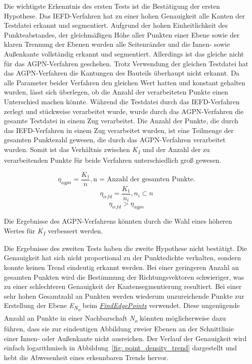 Die wichtigste Erkenntnis des ersten Tests ist die Bestätigung der ersten Hypothese. Das IEFD-Verfahren hat zu einer hohen Genauigkeit alle Kanten der Testdatei erkannt und segmentiert. Aufgrund der hohen Einheitlichkeit des Punkteabstandes, der gleichmäßigen Höhe aller Punkten einer Ebene sowie der klaren Trennung der Ebenen wurden alle Seitenränder und die Innen- sowie Außenkante vollständig erkannt und segmentiert. Allerdings ist das gleiche nicht für das AGPN-Verfahren geschehen. Trotz Verwendung der gleichen Testdatei hat das AGPN-Verfahren die Kantungen des Bauteils überhaupt nicht erkannt. Da alle Parameter beider Verfahren den gleichen Wert hatten und konstant gehalten wurden, lässt sich überlegen, ob die Anzahl der verarbeiteten Punkte einen Unterschied machen könnte. Während die Testdatei durch das IEFD-Verfahren zerlegt und stückweise verarbeitet wurde, wurde durch das AGPN-Verfahren die gesamte Testdatei in einem Zug verarbeitet. Die Anzahl der Punkte, die durch das IEFD-Verfahren in einem Zug verarbeitet wurden, ist eine Teilmenge der gesamten Punktezahl gewesen, die durch das AGPN-Verfahren verarbeitet wurden. Somit ist das Verhältnis zwischen \textit{K\textsubscript{1}} und der Anzahl der zu verarbeitenden Punkte für beide Verfahren unterschiedlich groß gewesen.

\begin{displaymath}
	\eta_{agpn} = \frac{K_1}{n}, \text{n = Anzahl der gesamten Punkte.}
\end{displaymath}
\begin{displaymath}
	\eta_{iefd} = \frac{K_1}{n_i}, n_i \subset n
\end{displaymath}
\begin{displaymath}
	\eta_{iefd} > \eta_{agpn}
\end{displaymath}

Die Ergebnisse des AGPN-Verfahrens könnten durch die Wahl eines höheren Wertes für \textit{K\textsubscript{1}} verbessert werden.

Die Ergebnisse des zweiten Tests haben die zweite Hypothese nicht bestätigt. Die Genauigkeit hat sich nicht proportional zu der Punktedichte verhalten, sondern konnte keinen Trend eindeutig erkannt werden. Bei einer geringeren Anzahl an gesamten Punkten wird die Bestimmung der Richtungsvektoren schwieriger, was zu einer schlechteren Genauigkeit der Kantensegmentierung resultiert. Bei einer sehr hohen Gesamtzahl an Punkten werden wiederum unzureichende Punkte zur Erstellung der Ebene \textit{E\textsubscript{N\textsubscript{o}}} beim \textit{\hyperref[alg:find_edge_points]{FindEdgePoints}} verwendet. Diese ungenügende Anzahl an Punkte in einer Nachbarschaft \textit{N\textsubscript{o}} könnten möglicherweise dazu führen, dass sie zur eindeutigen Abbildung zweier Ebenen an der Schnittlinie einer Innen- oder Außenkante nicht ausreichen. Der Verlauf der Genauigkeit wird einfach logarithmisch in Abbildung~\ref{fig: point_density_trend} dargestellt und hebt die Abwesenheit eines erkennbaren Trends hervor. 

